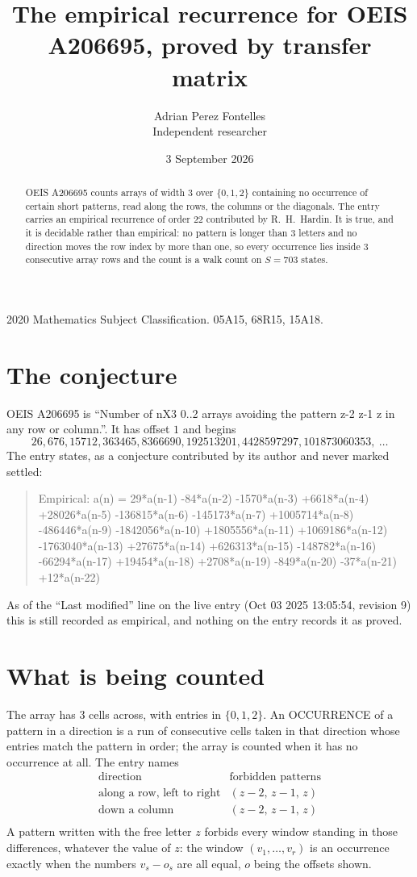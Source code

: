 \documentclass[11pt,a4paper]{article}
\title{The empirical recurrence for OEIS A206695, proved by transfer matrix}
\author{Adrian Perez Fontelles\\ \small Independent researcher}
\date{3 September 2026}
\theoremstyle{plain}
\theoremstyle{definition}
\begin{document}
\maketitle

\begin{abstract}
OEIS A206695 counts arrays of width $3$ over $\{0,1,2\}$ containing no occurrence of certain short
patterns, read along the rows, the columns or the diagonals. The entry carries an empirical
recurrence of order $22$ contributed by R.~H.~Hardin. It is true, and it is decidable
rather than empirical: no pattern is longer than $3$ letters and no direction moves the row
index by more than one, so every occurrence lies inside $3$ consecutive array rows and the
count is a walk count on $S=703$ states.
\end{abstract}

\noindent\small 2020 Mathematics Subject Classification. 05A15, 68R15, 15A18.\normalsize

\section{The conjecture}

OEIS A206695 is ``Number of nX3 0..2 arrays avoiding the pattern z-2 z-1 z in any row or column.''. It has offset $1$ and begins
\[
26, 676, 15712, 363465, 8366690, 192513201, 4428597297, 101873060353,\ \dots
\]
The entry states, as a conjecture contributed by its author and never marked settled:
\begin{quote}
Empirical: a(n) = 29*a(n-1) -84*a(n-2) -1570*a(n-3) +6618*a(n-4) +28026*a(n-5) -136815*a(n-6) -145173*a(n-7) +1005714*a(n-8) -486446*a(n-9) -1842056*a(n-10) +1805556*a(n-11) +1069186*a(n-12) -1763040*a(n-13) +27675*a(n-14) +626313*a(n-15) -148782*a(n-16) -66294*a(n-17) +19454*a(n-18) +2708*a(n-19) -849*a(n-20) -37*a(n-21) +12*a(n-22)
\end{quote}
As of the ``Last modified'' line on the live entry (Oct 03 2025 13:05:54, revision 9) this is still
recorded as empirical, and nothing on the entry records it as proved.

\section{What is being counted}

The array has $3$ cells across, with entries in $\{0,1,2\}$. An OCCURRENCE of a pattern in a
direction is a run of consecutive cells taken in that direction whose entries match the pattern
in order; the array is counted when it has no occurrence at all. The entry names
\[
\begin{array}{ll}
\text{direction} & \text{forbidden patterns} \\[2pt]
\text{along a row, left to right} & (z-2,\,z-1,\,z) \\
\text{down a column} & (z-2,\,z-1,\,z) \\
\end{array}
\]
 A pattern written with the free letter $z$ forbids every window standing in those differences, whatever the value of $z$: the window $(v_1,\dots,v_r)$ is an occurrence exactly when the numbers $v_s-o_s$ are all equal, $o$ being the offsets shown.
\end{document}
